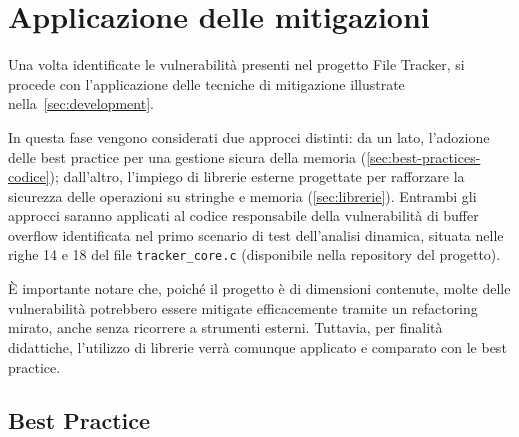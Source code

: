 \section{Applicazione delle mitigazioni}
\label{sec:mitigation_techniques}

Una volta identificate le vulnerabilità presenti nel progetto File Tracker, si
procede con l'applicazione delle tecniche di mitigazione illustrate nella~\autoref{sec:development}.

In questa fase vengono considerati due approcci distinti: da un lato, l'adozione
delle best practice per una gestione sicura della memoria (\autoref{sec:best-practices-codice});
dall'altro, l'impiego di librerie esterne progettate per rafforzare la sicurezza
delle operazioni su stringhe e memoria (\autoref{sec:librerie}). Entrambi gli approcci
saranno applicati al codice responsabile della vulnerabilità di buffer overflow identificata
nel primo scenario di test dell'analisi dinamica, situata nelle righe 14 e 18
del file \texttt{tracker\_core.c} (disponibile nella repository del progetto).

È importante notare che, poiché il progetto è di dimensioni contenute, molte delle
vulnerabilità potrebbero essere mitigate efficacemente tramite un refactoring mirato,
anche senza ricorrere a strumenti esterni. Tuttavia, per finalità didattiche, l'utilizzo
di librerie verrà comunque applicato e comparato con le best practice.




\subsection*{Best Practice}
\label{sec:best-practices-case-study}

